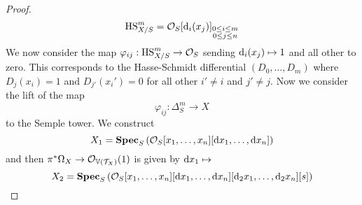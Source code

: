 \documentclass[12pt]{article}
\newcommand{\V}{\mathbb{V}}
\begin{document}
\begin{proof}
\[ \mathrm{HS}_{X/S}^m = \mathcal{O}_{S}[\mathrm{d}_i(x_j)]_{\substack{0 \le i \le m \\ 0 \le j \le n}} \]
We now consider the map $\varphi_{ij} : \mathrm{HS}^m_{X/S} \to \mathcal{O}_{S}$ sending $\mathrm{d}_i(x_j) \mapsto 1$ and all other to zero. This corresponds to the Hasse-Schmidt differential $(D_0, \dots, D_m)$ where $D_j(x_i) = 1$ and $D_{j'}(x_i') = 0$ for all other $i' \neq i$ and $j' \neq j$. Now we consider the lift of the map
\[ \varphi_{ij} : \Delta^m_{S} \to X \]
to the Semple tower. We construct
\[ X_1 = \mathbf{Spec}_{S}\left( \mathcal{O}_{S}[x_1, \dots, x_n][\mathrm{d}{x_1}, \dots, \mathrm{d}{x_n}] \right) \]
and then $\pi^* \Omega_X \to \struct{\V(\T_X)}(1)$ is given by $\mathrm{d}{x_1} \mapsto$ 
\[ X_2 = \mathbf{Spec}_{S}\left( \mathcal{O}_{S}[x_1, \dots, x_n][\mathrm{d}{x_1}, \dots, \mathrm{d}{x_n}][\mathrm{d}_2{x_1}, \dots, \mathrm{d}_2{x_n}][s] \right) \]
\end{proof}


 
\end{document}
